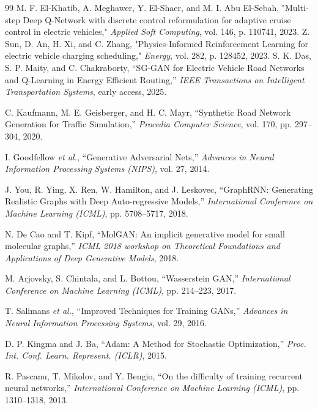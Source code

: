 \documentclass[conference]{IEEEtran}
\begin{document}
\begin{thebibliography}{99}
 M. F. El-Khatib, A. Meghawer, Y. El-Shaer, and M. I. Abu El-Sebah, "Multi-step Deep Q-Network with discrete control reformulation for adaptive cruise control in electric vehicles," \textit{Applied Soft Computing}, vol. 146, p. 110741, 2023.
 Z. Sun, D. An, H. Xi, and C. Zhang, "Physics-Informed Reinforcement Learning for electric vehicle charging scheduling," \textit{Energy}, vol. 282, p. 128452, 2023.
S. K. Das, S. P. Maity, and C. Chakraborty, ``SG-GAN for Electric Vehicle Road Networks and Q-Learning in Energy Efficient Routing,'' \textit{IEEE Transactions on Intelligent Transportation Systems}, early access, 2025.

C. Kaufmann, M. E. Geisberger, and H. C. Mayr, ``Synthetic Road Network Generation for Traffic Simulation,'' \textit{Procedia Computer Science}, vol. 170, pp. 297--304, 2020.

I. Goodfellow \textit{et al.}, ``Generative Adversarial Nets,'' \textit{Advances in Neural Information Processing Systems (NIPS)}, vol. 27, 2014.

J. You, R. Ying, X. Ren, W. Hamilton, and J. Leskovec, ``GraphRNN: Generating Realistic Graphs with Deep Auto-regressive Models,'' \textit{International Conference on Machine Learning (ICML)}, pp. 5708--5717, 2018.

N. De Cao and T. Kipf, ``MolGAN: An implicit generative model for small molecular graphs,'' \textit{ICML 2018 workshop on Theoretical Foundations and Applications of Deep Generative Models}, 2018.

M. Arjovsky, S. Chintala, and L. Bottou, ``Wasserstein GAN,'' \textit{International Conference on Machine Learning (ICML)}, pp. 214--223, 2017.

T. Salimans \textit{et al.}, ``Improved Techniques for Training GANs,'' \textit{Advances in Neural Information Processing Systems}, vol. 29, 2016.

D. P. Kingma and J. Ba, ``Adam: A Method for Stochastic Optimization,'' \textit{Proc. Int. Conf. Learn. Represent. (ICLR)}, 2015.

R. Pascanu, T. Mikolov, and Y. Bengio, ``On the difficulty of training recurrent neural networks,'' \textit{International Conference on Machine Learning (ICML)}, pp. 1310--1318, 2013.


\end{thebibliography}
\end{document}
